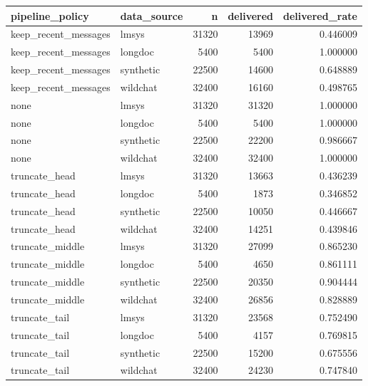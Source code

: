 \begin{tabular}{llrrr}
\toprule
pipeline_policy & data_source & n & delivered & delivered_rate \\
\midrule
keep_recent_messages & lmsys & 31320 & 13969 & 0.446009 \\
keep_recent_messages & longdoc & 5400 & 5400 & 1.000000 \\
keep_recent_messages & synthetic & 22500 & 14600 & 0.648889 \\
keep_recent_messages & wildchat & 32400 & 16160 & 0.498765 \\
none & lmsys & 31320 & 31320 & 1.000000 \\
none & longdoc & 5400 & 5400 & 1.000000 \\
none & synthetic & 22500 & 22200 & 0.986667 \\
none & wildchat & 32400 & 32400 & 1.000000 \\
truncate_head & lmsys & 31320 & 13663 & 0.436239 \\
truncate_head & longdoc & 5400 & 1873 & 0.346852 \\
truncate_head & synthetic & 22500 & 10050 & 0.446667 \\
truncate_head & wildchat & 32400 & 14251 & 0.439846 \\
truncate_middle & lmsys & 31320 & 27099 & 0.865230 \\
truncate_middle & longdoc & 5400 & 4650 & 0.861111 \\
truncate_middle & synthetic & 22500 & 20350 & 0.904444 \\
truncate_middle & wildchat & 32400 & 26856 & 0.828889 \\
truncate_tail & lmsys & 31320 & 23568 & 0.752490 \\
truncate_tail & longdoc & 5400 & 4157 & 0.769815 \\
truncate_tail & synthetic & 22500 & 15200 & 0.675556 \\
truncate_tail & wildchat & 32400 & 24230 & 0.747840 \\
\bottomrule
\end{tabular}
